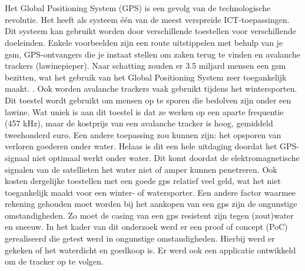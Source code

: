 
\chapter{}
\label{ch:inleiding}
Het Global Positioning System (GPS) is een gevolg van de technologische revolutie. Het heeft als systeem één van de meest verspreide ICT-toepassingen. Dit systeem kan gebruikt worden door verschillende toestellen voor verschillende doeleinden. Enkele voorbeelden zijn een route uitstippelen met behulp van je gsm, GPS-ontvangers die je instaat stellen om zaken terug te vinden en avalanche trackers (lawinepieper). Naar schatting zouden er 3.5 miljard mensen een gsm bezitten, wat het gebruik van het Global Positioning System zeer toegankelijk maakt. \autocite{numberOfSmartphones}. Ook worden avalanche trackers vaak gebruikt tijdens het wintersporten. Dit toestel wordt gebruikt om mensen op te sporen die bedolven zijn onder een lawine. Wat uniek is aan dit toestel is dat ze werken op een aparte frequentie (457 kHz), maar de kostprijs van een avalanche tracker is hoog, gemiddeld tweehonderd euro. \cite{avalancheTransceivers}
Een andere toepassing zou kunnen zijn: het opsporen van verloren goederen onder water. Helaas is dit een hele uitdaging doordat
het GPS-signaal niet optimaal werkt onder water. \autocite{underwaterProblem} Dit komt doordat de elektromagnetische signalen van de satellieten het water niet of amper kunnen penetreren. Ook kosten dergelijke toestellen met een goede gps relatief veel geld, wat het niet toegankelijk maakt voor een winter- of watersporter. 
Een andere factor waarmee rekening gehouden moet worden bij het aankopen van een gps zijn de ongunstige omstandigheden. Zo moet de casing van een gps resistent zijn tegen (zout)water en sneeuw.
In het kader van dit onderzoek werd er een proof of concept (PoC) gerealiseerd die getest werd in ongunstige omstandigheden. Hierbij werd er gekeken of het waterdicht en goedkoop is. Er werd ook een applicatie ontwikkeld om de tracker op te volgen.


\section{}
\label{sec:probleemstelling}

